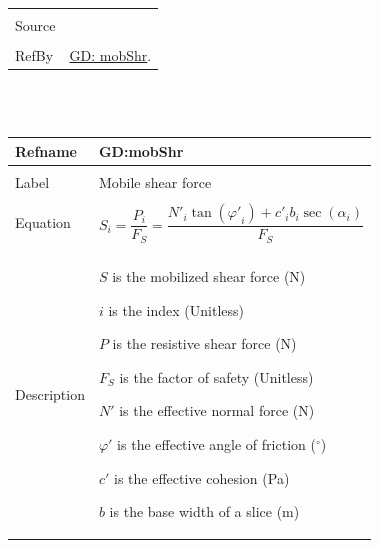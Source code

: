 \documentclass[12pt]{article}
\begin{document}
\begin{minipage}{\textwidth}
\begin{tabular}{p{} p{}}
                                         \\ \midrule \\
                                         Source & \cite{chen2005}
                                                  \\ \midrule \\
                                                  RefBy & \hyperref[GD:mobShr]{GD: mobShr}.
\\ \bottomrule \end{tabular}
\end{minipage}\\
~\newline
 \noindent \begin{minipage}{\textwidth}
\begin{tabular}{p{} p{}}
\toprule \textbf{Refname} & \textbf{GD:mobShr}
\label{GD:mobShr}
\\ \midrule \\
Label & Mobile shear force
        \\ \midrule \\
        Equation & \begin{displaymath}
                   S_{i}=\frac{P_{i}}{{F_{S}}}=\frac{{N'}_{i} \tan\left({φ'}_{i}\right)+{c'}_{i} b_{i} \sec\left(α_{i}\right)}{{F_{S}}}
                   \end{displaymath}
                   \\ \midrule \\
                   Description & \begin{symbDescription}
                                 \item{$S$ is the mobilized shear force (N)}
                                 \item{$i$ is the index (Unitless)}
                                 \item{$P$ is the resistive shear force (N)}
                                 \item{${F_{S}}$ is the factor of safety (Unitless)}
                                 \item{$N'$ is the effective normal force (N)}
                                 \item{$φ'$ is the effective angle of friction (${}^{\circ}$)}
                                 \item{$c'$ is the effective cohesion (Pa)}
                                 \item{$b$ is the base width of a slice (m)}

\end{symbDescription}
\end{tabular}
\end{minipage}
\end{document}
